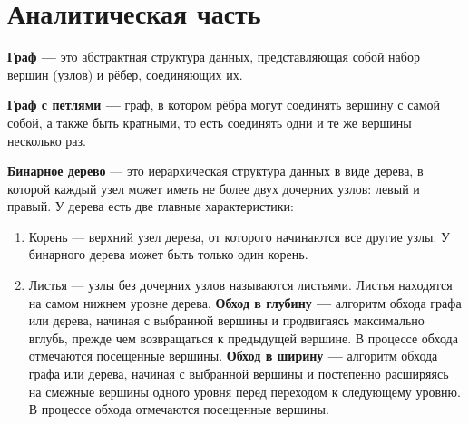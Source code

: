 \documentclass[12pt, a4paper]{article}
\begin{document}
\newpage
\section{Аналитическая часть}
\textbf{Граф ---} это абстрактная структура данных, представляющая собой набор 
вершин (узлов) и рёбер, соединяющих их. 

\textbf{Граф с петлями ---} граф, в котором рёбра могут соединять вершину с 
самой собой, а также быть кратными, то есть соединять одни и те же 
вершины несколько раз.

\textbf{Бинарное дерево} --- это иерархическая структура данных в виде дерева, в 
которой каждый узел может иметь не более двух дочерних узлов: левый и правый. У 
дерева есть две главные характеристики:
\begin{enumerate}
    \item Корень --- верхний узел дерева, от которого начинаются все другие 
    узлы. У бинарного дерева может быть только один корень.
    \item Листья --- узлы без дочерних узлов называются листьями. Листья 
    находятся на самом нижнем уровне дерева.
\textbf{Обход в глубину ---} алгоритм обхода графа или дерева, начиная с 
выбранной вершины и продвигаясь максимально вглубь, прежде чем возвращаться к 
предыдущей вершине. В процессе обхода отмечаются посещенные вершины.
\textbf{Обход в ширину ---} алгоритм обхода графа или дерева, начиная с 
выбранной вершины и постепенно расширяясь на смежные вершины одного уровня перед 
переходом к следующему уровню. В процессе обхода отмечаются посещенные вершины.
\end{enumerate}
\newpage
\end{document}

